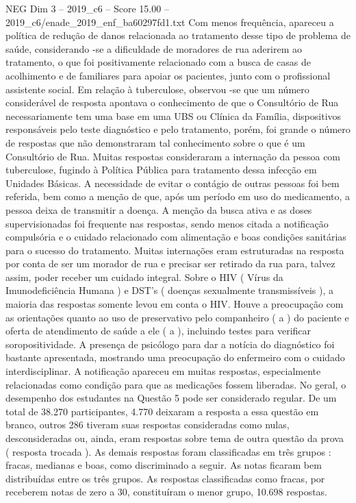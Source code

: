 \begin{textsample}{NEG Dim 3 – 2019\_c6 – Score 15.00 – 2019\_c6/enade\_2019\_enf\_ba60297fd1.txt}
Com menos frequência, apareceu a política de redução de danos relacionada ao tratamento desse tipo de problema de saúde, considerando -se a dificuldade de moradores de rua aderirem ao tratamento, o que foi positivamente relacionado com a busca de casas de acolhimento e de familiares para apoiar os pacientes, junto com o profissional assistente social.
Em relação à tuberculose, observou -se que um número considerável de resposta apontava o conhecimento de que o Consultório de Rua necessariamente tem uma base em uma UBS ou Clínica da Família, dispositivos responsáveis pelo teste diagnóstico e pelo tratamento, porém, foi grande o número de respostas que não demonstraram tal conhecimento sobre o que é um Consultório de Rua.
Muitas respostas consideraram a internação da pessoa com tuberculose, fugindo à Política Pública para tratamento dessa infecção em Unidades Básicas.
A necessidade de evitar o contágio de outras pessoas foi bem referida, bem como a menção de que, após um período em uso do medicamento, a pessoa deixa de transmitir a doença.
A menção da busca ativa e as doses supervisionadas foi frequente nas respostas, sendo menos citada a notificação compulsória e o cuidado relacionado com alimentação e boas condições sanitárias para o sucesso do tratamento.
Muitas internações eram estruturadas na resposta por conta de ser um morador de rua e precisar ser retirado da rua para, talvez assim, poder receber um cuidado integral.
Sobre o HIV ( Vírus da Imunodeficiência Humana ) e DST’s ( doenças sexualmente transmissíveis ), a maioria das respostas somente levou em conta o HIV.
Houve a preocupação com as orientações quanto ao uso de preservativo pelo companheiro ( a ) do paciente e oferta de atendimento de saúde a ele ( a ), incluindo testes para verificar soropositividade.
A presença de psicólogo para dar a notícia do diagnóstico foi bastante apresentada, mostrando uma preocupação do enfermeiro com o cuidado interdisciplinar.
A notificação apareceu em muitas respostas, especialmente relacionadas como condição para que as medicações fossem liberadas.
No geral, o desempenho dos estudantes na Questão 5 pode ser considerado regular.
De um total de 38.270 participantes, 4.770 deixaram a resposta a essa questão em branco, outros 286 tiveram suas respostas consideradas como nulas, desconsideradas ou, ainda, eram respostas sobre tema de outra questão da prova ( resposta trocada ).
As demais respostas foram classificadas em três grupos : fracas, medianas e boas, como discriminado a seguir.
As notas ficaram bem distribuídas entre os três grupos.
As respostas classificadas como fracas, por receberem notas de zero a 30, constituíram o menor grupo, 10.698 respostas.

\end{textsample}
